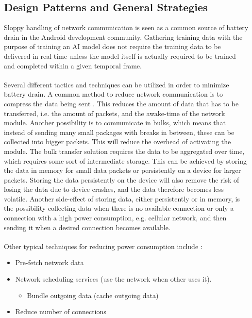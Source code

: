 \subsection{Design Patterns and General Strategies}
\label{sub:design_patterns_and_general_strategies}

Sloppy handling of network communication is seen as a common source of battery drain \parencite{android_network_scheduling} in the Android development community. Gathering training data with the purpose of training an AI model does not require the training data to be delivered in real time unless the model itself is actually required to be trained and completed within a given temporal frame. 
\\\\
Several different tactics and techniques can be utilized in order to minimize battery drain. A common method to reduce network communication is to compress the data being sent \parencite{har_wearables}\parencite{android_network_scheduling}. This reduces the amount of data that has to be transferred, i.e. the amount of packets, and the awake-time of the network module. Another possibility is to communicate in bulks, which means that instead of sending many small packages with breaks in between, these can be collected into bigger packets. This will reduce the overhead of activating the module. The bulk transfer solution requires the data to be aggregated over time, which requires some sort of intermediate storage. This can be achieved by storing the data in memory for small data packets or persistently on a device for larger packets. Storing the data persistently on the device will also remove the risk of losing the data due to device crashes, and the data therefore becomes less volatile. Another side-effect of storing data, either persistently or in memory, is the possibility collecting data when there is no available connection or only a connection with a high power consumption, e.g. cellular network, and then sending it when a desired connection becomes available. 
\\\\
Other typical techniques for reducing power consumption include \parencite{android_network_scheduling}:

\begin{itemize}
    \item Pre-fetch network data
    \item Network scheduling services (use the network when other uses it).
    \begin{itemize}
        \item Bundle outgoing data (cache outgoing data)
    \end{itemize}
    \item Reduce number of connections
\end{itemize}

